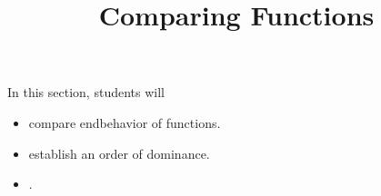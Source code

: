 \documentclass{ximera}
\title{Comparing Functions}
\begin{document}
\begin{abstract}
\end{abstract}
\maketitle

\begin{sectionOutcomes}
In this section, students will 

\begin{itemize}
\item compare endbehavior of functions.
\item establish an order of dominance.
\item .
\end{itemize}
\end{sectionOutcomes}
\end{document}
